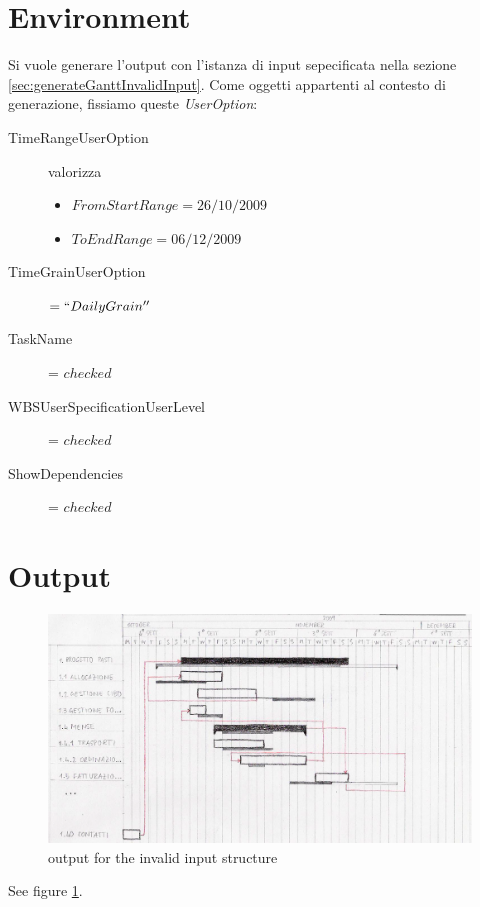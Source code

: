\section{Environment}
Si vuole generare l'output con l'istanza di input sepecificata nella sezione
\ref{sec:generateGanttInvalidInput}. Come oggetti appartenti al contesto di
generazione, fissiamo queste \emph{UserOption}:
\begin{description}
  \item[TimeRangeUserOption] valorizza
  \begin{itemize}
  \item $FromStartRange = 26/10/2009$
  \item $ToEndRange = 06/12/2009$
  \end{itemize} 
  \item[TimeGrainUserOption] $= ``DailyGrain''$
  \item[TaskName] = $checked$
  \item[WBSUserSpecificationUserLevel] = $checked$
  \item[ShowDependencies] = $checked$
\end{description}

\section{Output}
\begin{figure} 
\centering
\includegraphics[width=1\textwidth]{case_spec/generate_Gantt/invalidOutput.png}
\caption{output for the invalid input structure}
\label{fig:generateGanttInvalidOutputMockup}
\end{figure}
See figure \ref{fig:generateGanttInvalidOutputMockup}.

